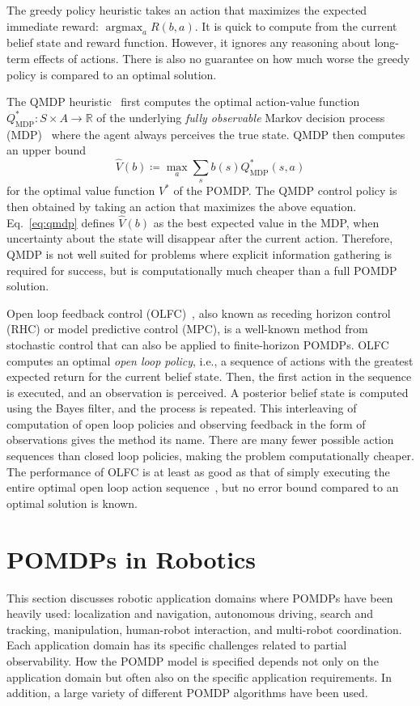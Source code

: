 \documentclass[journal]{IEEEtran}
\DeclareMathOperator*{\argmax}{argmax}
\begin{document}
The greedy policy heuristic takes an action that maximizes the expected immediate reward: $\argmax_{a} R(b,a)$.
It is quick to compute from the current belief state and reward function.
However, it ignores any reasoning about long-term effects of actions.
{There is also no guarantee on how much worse the greedy policy} is compared to an optimal solution.

The QMDP heuristic~\cite{littman1995learning} first computes the
optimal action-value function $Q_{\text{MDP}}^*\colon S\times
A\to\mathbb{R}$ of the underlying \emph{fully observable} Markov
decision process (MDP)~\cite{puterman1994markov} where the agent
always perceives the true state.  QMDP then computes an upper bound
\begin{equation}
\label{eq:qmdp}
    \hat{V}(b) \coloneqq \max\limits_{a}\sum\limits_{s}b(s)Q_{\text{MDP}}^*(s,a)
\end{equation}
for the optimal value function $V^*$ of the POMDP.  The QMDP control
policy is then obtained by taking an action that maximizes the above
equation.  Eq.~\eqref{eq:qmdp} defines $\hat{V}(b)$ as the best
expected value in the MDP, when uncertainty about the state will
disappear after the current action.  Therefore, QMDP is not well
suited for problems where explicit information gathering is required
for success, but is computationally much cheaper than a full POMDP
solution.

Open loop feedback control (OLFC)~\cite{bertsekas2005dynamic}, also known as receding horizon control (RHC) or
model predictive control (MPC), is a well-known method from
stochastic control that can also be applied to finite-horizon
POMDPs.  OLFC computes an optimal
\emph{open loop policy}, i.e., a sequence of actions with the greatest
expected return for the current belief state.  Then, the first action
in the sequence is executed, and an observation is perceived.  A
posterior belief state is computed using the Bayes filter, and the
process is repeated.  This interleaving of computation of open loop
policies and observing feedback in the form of observations gives the
method its name.  There are many fewer possible action sequences than
closed loop policies, making the problem computationally cheaper.  The
performance of OLFC is at least as good as that of simply executing
the entire optimal open loop action
sequence~\cite{bertsekas2005dynamic}, but no error bound compared to
an optimal solution is known.

\section{POMDPs in Robotics}
\label{sec:applications}
This section discusses robotic application domains where POMDPs have
been heavily used: localization and navigation, autonomous driving, search and tracking, manipulation, human-robot interaction, and multi-robot coordination.
Each application domain has its specific
challenges related to partial observability. How the POMDP model is
specified depends not only on the application domain but often also on
the specific application requirements. In addition, a large variety of
different POMDP algorithms have been used.
\end{document}
